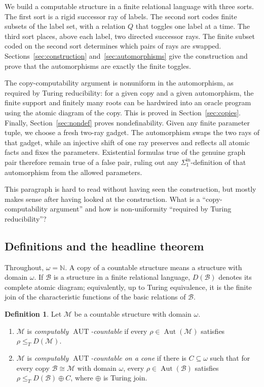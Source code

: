\documentclass[12pt]{article}
\theoremstyle{definition}
\newtheorem{definition}[theorem]{Definition}
\theoremstyle{remark}
\newcommand{\Aut}{\operatorname{Aut}}
\newcommand{\review}[1]{\begin{reviewbox}#1\end{reviewbox}}
\begin{document}
We build a computable structure in a finite relational language with three sorts.  The first sort is a rigid successor ray of labels.  The second sort codes finite subsets of the label set, with a relation \(Q\) that toggles one label at a time.  The third sort places, above each label, two directed successor rays.  The finite subset coded on the second sort determines which pairs of rays are swapped.  Sections~\ref{sec:construction} and~\ref{sec:automorphisms} give the construction and prove that the automorphisms are exactly the finite toggles.

The copy-computability argument is nonuniform in the automorphism, as required by Turing reducibility: for a given copy and a given automorphism, the finite support and finitely many roots can be hardwired into an oracle program using the atomic diagram of the copy.  This is proved in Section~\ref{sec:copies}.  Finally, Section~\ref{sec:nondef} proves nondefinability.  Given any finite parameter tuple, we choose a fresh two-ray gadget.  The automorphism swaps the two rays of that gadget, while an injective shift of one ray preserves and reflects all atomic facts and fixes the parameters.  Existential formulas true of the genuine graph pair therefore remain true of a false pair, ruling out any \(\Sigma^{\mathrm{in}}_1\)-definition of that automorphism from the allowed parameters.

\review{This paragraph is hard to read without having seen the construction, but mostly makes sense after having looked at the construction. What is a ``copy-computability argument'' and how is non-uniformity ``required by Turing reducibility''?}

\subsection{Definitions and the headline theorem}

Throughout, \(\omega=\mathbb N\).  A copy of a countable structure means a structure with domain \(\omega\).  If \(\mathcal B\) is a structure in a finite relational language, \(D(\mathcal B)\) denotes its complete atomic diagram; equivalently, up to Turing equivalence, it is the finite join of the characteristic functions of the basic relations of \(\mathcal B\).

\begin{definition}
Let \(\mathcal M\) be a countable structure with domain \(\omega\).
\begin{enumerate}
\item \(\mathcal M\) is \emph{computably \(\operatorname{AUT}\)-countable} if every \(\rho\in\Aut(\mathcal M)\) satisfies \(\rho\leq_T D(\mathcal M)\).
\item \(\mathcal M\) is \emph{computably \(\operatorname{AUT}\)-countable on a cone} if there is \(C\subseteq\omega\) such that for every copy \(\mathcal B\cong\mathcal M\) with domain \(\omega\), every \(\rho\in\Aut(\mathcal B)\) satisfies \(\rho\leq_T D(\mathcal B)\oplus C\), where \(\oplus\) is Turing join.
\end{enumerate}
\end{definition}
\end{document}
